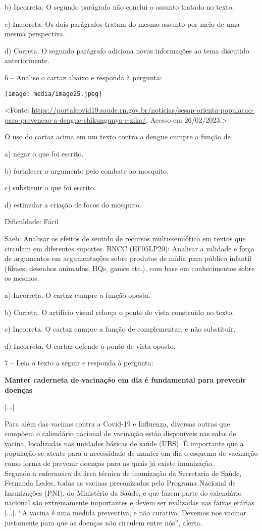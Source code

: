 b) Incorreta. O segundo parágrafo não conclui o assunto tratado no
texto.

c) Incorreta. Os dois parágrafos tratam do mesmo assunto por meio de uma
mesma perspectiva.

d) Correta. O segundo parágrafo adiciona novas informações ao tema
discutido anteriormente.

6 -- Analise o cartaz abaixo e responda à pergunta:

\texttt{[image: media/image25.jpeg]}

\textless{}Fonte:
\url{https://portalcovid19.saude.rn.gov.br/noticias/sesap-orienta-populacao-para-prevencao-a-dengue-chikungunya-e-zika/}.
Acesso em 26/02/2023.\textgreater{}

O uso do cartaz acima em um texto contra a dengue cumpre a função de

a) negar o que foi escrito.

b) fortalecer o argumento pelo combate ao mosquito.

c) substituir o que foi escrito.

d) estimular a criação de focos do mosquito.

Dificuldade: Fácil

Saeb: Analisar os efeitos de sentido de recursos multissemiótico em
textos que circulam em diferentes suportes. BNCC (EF05LP20): Analisar a
validade e força de argumentos em argumentações sobre produtos de mídia
para público infantil (filmes, desenhos animados, HQs, games etc.), com
base em conhecimentos sobre os mesmos.

a) Incorreta. O cartaz cumpre a função oposta.

b) Correta. O artifício visual reforça o ponto de vista construído no
texto.

c) Incorreta. O cartaz cumpre a função de complementar, e não
substituir.

d) Incorreta. O cartaz defende o ponto de vista oposto.

7 -- Leia o texto a seguir e responda à pergunta:

\textbf{Manter caderneta de vacinação em dia é fundamental para prevenir
doenças}

{[}...{]}

Para além das vacinas contra a Covid-19 e Influenza, diversas outras que
compõem o calendário nacional de vacinação estão disponíveis nas salas
de vacina, localizadas nas unidades básicas de saúde (UBS). É importante
que a população se atente para a necessidade de manter em dia o esquema
de vacinação como forma de prevenir doenças para as quais já existe
imunização.\\
Segundo a enfermeira da área técnica de imunização da Secretaria de
Saúde, Fernanda Ledes, todas as vacinas preconizadas pelo Programa
Nacional de Imunizações (PNI), do Ministério da Saúde, e que fazem parte
do calendário nacional são extremamente importantes e devem ser
realizadas nas faixas etárias {[}...{]}. ``A vacina é uma medida
preventiva, e não curativa. Devemos nos vacinar justamente para que as
doenças não circulem entre nós'', alerta.

